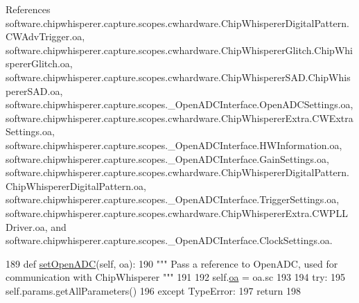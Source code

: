 References software.\+chipwhisperer.\+capture.\+scopes.\+cwhardware.\+Chip\+Whisperer\+Digital\+Pattern.\+C\+W\+Adv\+Trigger.\+oa, software.\+chipwhisperer.\+capture.\+scopes.\+cwhardware.\+Chip\+Whisperer\+Glitch.\+Chip\+Whisperer\+Glitch.\+oa, software.\+chipwhisperer.\+capture.\+scopes.\+cwhardware.\+Chip\+Whisperer\+S\+A\+D.\+Chip\+Whisperer\+S\+A\+D.\+oa, software.\+chipwhisperer.\+capture.\+scopes.\+\_\+\+Open\+A\+D\+C\+Interface.\+Open\+A\+D\+C\+Settings.\+oa, software.\+chipwhisperer.\+capture.\+scopes.\+cwhardware.\+Chip\+Whisperer\+Extra.\+C\+W\+Extra\+Settings.\+oa, software.\+chipwhisperer.\+capture.\+scopes.\+\_\+\+Open\+A\+D\+C\+Interface.\+H\+W\+Information.\+oa, software.\+chipwhisperer.\+capture.\+scopes.\+\_\+\+Open\+A\+D\+C\+Interface.\+Gain\+Settings.\+oa, software.\+chipwhisperer.\+capture.\+scopes.\+cwhardware.\+Chip\+Whisperer\+Digital\+Pattern.\+Chip\+Whisperer\+Digital\+Pattern.\+oa, software.\+chipwhisperer.\+capture.\+scopes.\+\_\+\+Open\+A\+D\+C\+Interface.\+Trigger\+Settings.\+oa, software.\+chipwhisperer.\+capture.\+scopes.\+cwhardware.\+Chip\+Whisperer\+Extra.\+C\+W\+P\+L\+L\+Driver.\+oa, and software.\+chipwhisperer.\+capture.\+scopes.\+\_\+\+Open\+A\+D\+C\+Interface.\+Clock\+Settings.\+oa.


\begin{DoxyCode}
189     \textcolor{keyword}{def }\hyperlink{classsoftware_1_1chipwhisperer_1_1capture_1_1scopes_1_1cwhardware_1_1ChipWhispererSAD_1_1ChipWhispererSAD_aa66e31e0574fc2249f45210aa57a9243}{setOpenADC}(self, oa):
190         \textcolor{stringliteral}{""" Pass a reference to OpenADC, used for communication with ChipWhisperer """}
191 
192         self.\hyperlink{classsoftware_1_1chipwhisperer_1_1capture_1_1scopes_1_1cwhardware_1_1ChipWhispererSAD_1_1ChipWhispererSAD_a3544050360814da040141bfe7a63a772}{oa} = oa.sc
193             
194         \textcolor{keywordflow}{try}:
195             self.params.getAllParameters()
196         \textcolor{keywordflow}{except} TypeError:
197             \textcolor{keywordflow}{return}
198         
\end{DoxyCode}
\hypertarget{classsoftware_1_1chipwhisperer_1_1capture_1_1scopes_1_1cwhardware_1_1ChipWhispererSAD_1_1ChipWhispererSAD_a12c38f3ea020a9e1d721a812784c1983}{}
